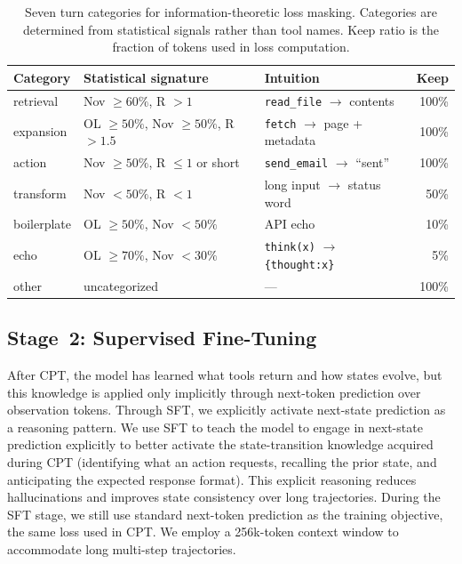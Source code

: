 \begin{table}[!ht]
\caption{Seven turn categories for information-theoretic loss masking. Categories are determined from statistical signals rather than tool names. Keep ratio is the fraction of tokens used in loss computation.}
\label{tab:loss_mask_categories}
\centering
\small
\begin{tabular}{@{}lp{4.5cm}p{4cm}r@{}}
\toprule
\textbf{Category} & \textbf{Statistical signature} & \textbf{Intuition} & \textbf{Keep} \\
\midrule
retrieval    & Nov $\geq 60\%$, R $> 1$           & \texttt{read\_file} $\to$ contents       & 100\% \\
expansion    & OL $\geq 50\%$, Nov $\geq 50\%$, R $> 1.5$ & \texttt{fetch} $\to$ page + metadata & 100\% \\
action       & Nov $\geq 50\%$, R $\leq 1$ or short & \texttt{send\_email} $\to$ ``sent''     & 100\% \\
transform    & Nov $< 50\%$, R $< 1$               & long input $\to$ status word            & 50\%  \\
boilerplate  & OL $\geq 50\%$, Nov $< 50\%$        & API echo                                & 10\%  \\
echo         & OL $\geq 70\%$, Nov $< 30\%$        & \texttt{think(x)} $\to$ \texttt{\{thought:x\}} & 5\% \\
other        & uncategorized                       & ---                                     & 100\% \\
\bottomrule
\end{tabular}
\end{table}


\subsection{Stage~2: Supervised Fine-Tuning}
\label{sec:pipeline:sft}

After CPT, the model has learned what tools return and how states evolve, but this knowledge is applied only implicitly through next-token prediction over observation tokens.
Through SFT, we explicitly activate next-state prediction as a reasoning pattern.
We use SFT to teach the model to engage in next-state prediction explicitly to better activate the state-transition knowledge acquired during CPT (identifying what an action requests, recalling the prior state, and anticipating the expected response format).
This explicit reasoning reduces hallucinations and improves state consistency over long trajectories.
During the SFT stage, we still use standard next-token prediction as the training objective, the same loss used in CPT.
We employ a 256k-token context window to accommodate long multi-step trajectories.

